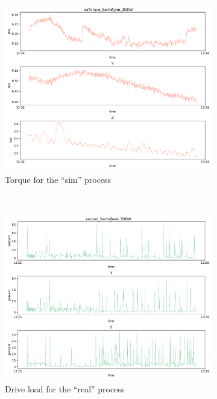 \documentclass[english]{scrartcl}
\begin{document}
\begin{figure}
\begin{subfigure}[t]{0.5\textwidth}
        \includegraphics[width=\textwidth]{sim_torque.pdf}
        \caption{Torque for the ``sim'' process}
    \end{subfigure}%
    \\
    \begin{subfigure}[t]{0.5\textwidth}
        \includegraphics[width=\textwidth]{real_load.pdf}
        \caption{Drive load for the ``real'' process}
    \end{subfigure}%
    ~
    \begin{subfigure}[t]{0.5\textwidth}

\end{subfigure}
\end{figure}
\end{document}
